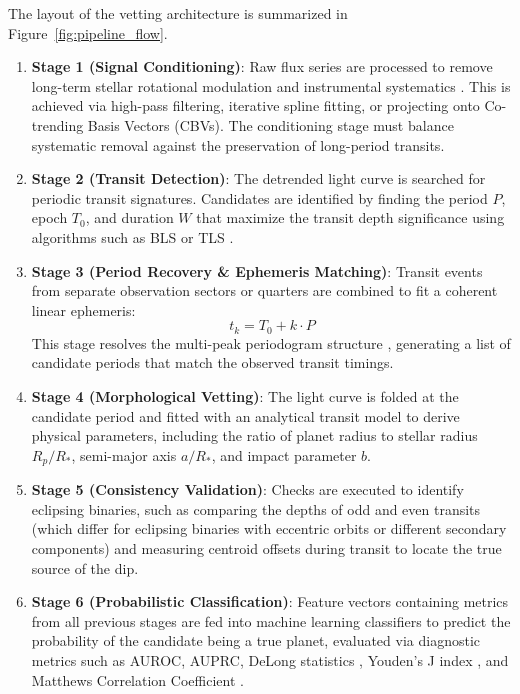 The layout of the vetting architecture is summarized in Figure~\ref{fig:pipeline_flow}.
\begin{enumerate}
\item \textbf{Stage 1 (Signal Conditioning)}: Raw flux series are processed to remove long-term stellar rotational modulation and instrumental systematics \citep{Smith2012, Stumpe2012, Vanderburg2014, Luger2016, Luger2018, Aigrain2016}. This is achieved via high-pass filtering, iterative spline fitting, or projecting onto Co-trending Basis Vectors (CBVs). The conditioning stage must balance systematic removal against the preservation of long-period transits.
\item \textbf{Stage 2 (Transit Detection)}: The detrended light curve is searched for periodic transit signatures. Candidates are identified by finding the period $P$, epoch $T_0$, and duration $W$ that maximize the transit depth significance using algorithms such as BLS \citep{Kovacs2002} or TLS \citep{Hippke2019}.
\item \textbf{Stage 3 (Period Recovery \& Ephemeris Matching)}: Transit events from separate observation sectors or quarters are combined to fit a coherent linear ephemeris:
   \begin{equation}
   t_k = T_0 + k \cdot P
   \label{eq:ephemeris}
   \end{equation}
   This stage resolves the multi-peak periodogram structure \citep{Deeming1975, Roberts1987, Lomb1976, Scargle1982, VanderPlas2018, Dawson2010}, generating a list of candidate periods that match the observed transit timings.
\item \textbf{Stage 4 (Morphological Vetting)}: The light curve is folded at the candidate period and fitted with an analytical transit model \citep{Mandel2002, Gimenez2006, Kreidberg2015, Seager2003} to derive physical parameters, including the ratio of planet radius to stellar radius $R_p/R_*$, semi-major axis $a/R_*$, and impact parameter $b$.
\item \textbf{Stage 5 (Consistency Validation)}: Checks are executed to identify eclipsing binaries, such as comparing the depths of odd and even transits (which differ for eclipsing binaries with eccentric orbits or different secondary components) and measuring centroid offsets during transit to locate the true source of the dip.
\item \textbf{Stage 6 (Probabilistic Classification)}: Feature vectors containing metrics from all previous stages are fed into machine learning classifiers to predict the probability of the candidate being a true planet, evaluated via diagnostic metrics such as AUROC, AUPRC, DeLong statistics \citep{DeLong1988}, Youden's J index \citep{Youden1950}, and Matthews Correlation Coefficient \citep[MCC;][]{Matthews1975}.
\end{enumerate}

